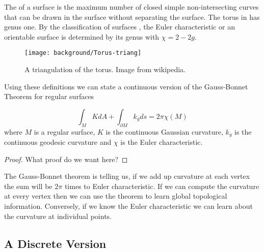The  of a surface is the maximum number of closed simple
non-intersecting curves that can be drawn in the surface without separating
the surface.
The torus in  has genus one.
By the classification of surfaces \cite{munkres}, the Euler characteristic or an orientable surface
is determined by its genus with $\chi=2-2g$.



\begin{figure}[htb]
\centering
\texttt{[image: background/Torus-triang]}
\caption{A triangulation of the torus. Image from wikipedia.}
\label{fig:triangulated-torus}
\end{figure}



Using these definitions we can state a continuous version of
the Gauss-Bonnet Theorem for regular surfaces
\begin{theorem} \label{thm:g-b-c}

$$\int_{M} K dA+ \int_{\partial M} k_g ds = 2\pi \chi(M)$$
where $M$ is a regular surface, $K$ is the continuous Gaussian curvature,
 $k_g$ is the continuous geodesic curvature and
$\chi$ is the Euler characteristic.
\end{theorem}

\begin{proof}
	What proof do we want here?
\end{proof}

The  Gauss-Bonnet theorem is  telling us, if we add up curvature
at each vertex the sum will be $2\pi$ times to Euler characteristic.
If we can compute the curvature at every vertex then we can use the theorem
to learn global topological information.
Conversely, if we know the Euler characteristic we can learn about the curvature
at individual points.

\subsection{A Discrete Version}

